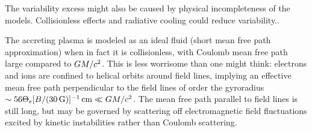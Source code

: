 




The variability excess might also be caused by physical incompleteness of the models.  Collisionless effects and radiative cooling could reduce variability..

The accreting plasma is modeled as an ideal fluid (short mean free path approximation) when in fact it is collisionless, with Coulomb mean free path large compared to $GM/c^2$.  This is less worrisome than one might think: electrons and ions are confined to helical orbits around field lines, implying an effective mean free path perpendicular to the field lines of order the gyroradius $\sim 56 \Theta_e [B/(30\,\mathrm{G})]^{-1} \,\mathrm{cm} \ll GM/c^2$.  The mean free path parallel to field lines is still long, but may be governed by scattering off electromagnetic field fluctuations excited by kinetic instabilities rather than Coulomb scattering.


